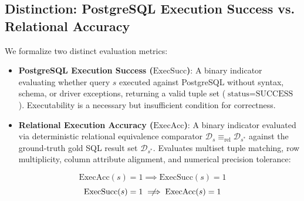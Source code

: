 \documentclass[conference]{IEEEtran}
\begin{document}
\subsection{Distinction: PostgreSQL Execution Success vs. Relational Accuracy}
We formalize two distinct evaluation metrics:
\begin{itemize}
    \item \textbf{PostgreSQL Execution Success ($\text{ExecSucc}$)}: A binary indicator evaluating whether query $s$ executed against PostgreSQL without syntax, schema, or driver exceptions, returning a valid tuple set ($\text{status} = \text{SUCCESS}$). Executability is a necessary but insufficient condition for correctness.
    \item \textbf{Relational Execution Accuracy ($\text{ExecAcc}$)}: A binary indicator evaluated via deterministic relational equivalence comparator $\mathcal{D}_s \equiv_{\text{rel}} \mathcal{D}_{s^*}$ against the ground-truth gold SQL result set $\mathcal{D}_{s^*}$. Evaluates multiset tuple matching, row multiplicity, column attribute alignment, and numerical precision tolerance:
\end{itemize}
\begin{equation}
\text{ExecAcc}(s) = 1 \implies \text{ExecSucc}(s) = 1
\end{equation}
\begin{equation}
\text{ExecSucc}(s) = 1 \centernot\implies \text{ExecAcc}(s) = 1
\end{equation}
\end{document}
